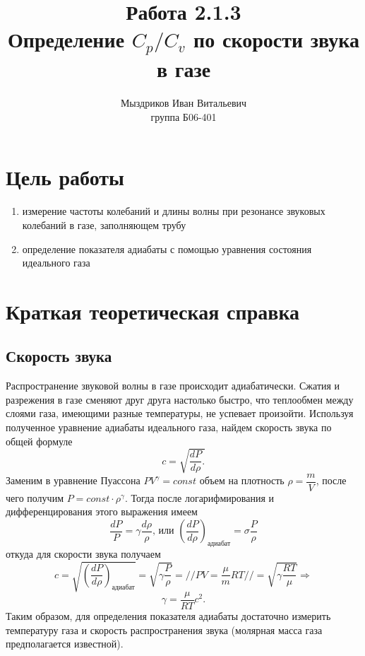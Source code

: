 \documentclass[a4paper, 12pt]{article}%
\author{Мыздриков Иван Витальевич \\
группа Б06-401}
\title{\textbf{Работа 2.1.3 \\ 
Определение $C_p / C_v$ по скорости звука в газе}}
\begin{document}
\maketitle
\newpage
\section*{Цель работы}
\begin{enumerate}
\item измерение частоты колебаний и длины волны при резонансе звуковых колебаний в газе, заполняющем трубу
\item определение показателя адиабаты с помощью уравнения состояния идеального газа
\end{enumerate}
\section*{Краткая теоретическая справка}
\subsection*{Скорость звука}
Распространение звуковой волны в газе происходит адиабатически. Сжатия и разрежения в газе сменяют друг друга настолько быстро, что теплообмен между слоями газа, имеющими разные температуры, не успевает произойти. Используя полученное уравнение адиабаты идеального газа, найдем скорость звука по общей формуле
\[c = \sqrt{\dfrac{dP}{d \rho}.}\]
Заменим в уравнение Пуассона $PV^{\gamma} = const$ объем на плотность $\rho = \dfrac{m}{V}$, после чего получим $P = const \cdot \rho^{\gamma}$. Тогда после логарифмирования и дифференцирования этого выражения имеем 
\[ \dfrac{dP}{P} = \gamma \dfrac{d \rho }{\rho} \text{, или } \left( \dfrac{dP}{d\rho} \right)_\text{адиабат} = \sigma \dfrac{P}{\rho} \]
откуда для скорости звука получаем
\[ c = \sqrt{\left( \dfrac{dP}{d\rho} \right)_\text{адиабат}} = \sqrt{\gamma \dfrac{P}{\rho}} = // PV = \dfrac{\mu}{m} RT // = \sqrt{\gamma \dfrac{RT}{\mu}} \Rightarrow \]
\[ \gamma = \dfrac{\mu}{RT} c^2.\]
Таким образом, для определения показателя адиабаты достаточно измерить температуру газа и скорость распространения звука (молярная масса газа предполагается известной).
\end{document}
